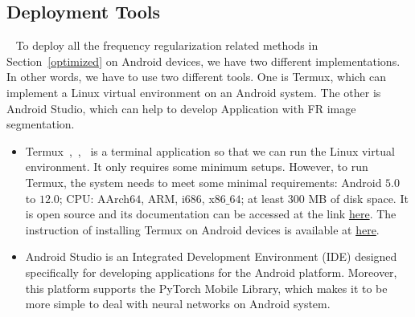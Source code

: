 \documentclass[runningheads]{llncs}
\begin{document}
\subsection{Deployment Tools}~\label{deployment}
To deploy all the frequency regularization related methods in Section~\ref{optimized} on Android devices, we have two different implementations. In other words, we have to use two different tools. One is Termux, which can implement a Linux virtual environment on an Android system. The other is Android Studio, which can help to develop Application with FR image segmentation.
\begin{itemize}
	\item Termux~\cite{termux_repo},~\cite{termux_overview},~\cite{termux_wiki}  is a terminal application so that we can run the Linux virtual environment. It only requires some minimum setups. However, to run Termux, the system needs to meet some minimal requirements: Android $5.0$ to $12.0$; CPU: AArch$64$, ARM, i$686$, x$86\_64$; at least $300$ MB of disk space. It is open source and its documentation can be accessed at the link \href{https://github.com/termux/termux-app}{here}. The instruction of installing Termux on Android devices is available at \href{https://github.com/btxcy/NeuralOnMobile\#readme}{here}. 
	\item Android Studio is an Integrated Development Environment (IDE) designed specifically for developing applications for the Android platform. Moreover, this platform supports the PyTorch Mobile Library, which makes it to be more simple to deal with neural networks on Android system.
\end{itemize}	 		
\end{document}
